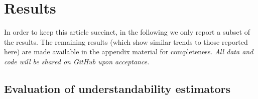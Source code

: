 \documentclass[10pt,a4paper]{article}
\begin{document}
\section*{Results}

In order to keep this article  succinct, in the following we only report a subset of the results. The remaining results (which show similar trends to those reported here) are made available in the appendix material  for completeness.  \textit{All data and code will be shared on GitHub upon acceptance.}

\subsection*{Evaluation of understandability estimators}
\label{sec:beyond_readability}
\end{document}

